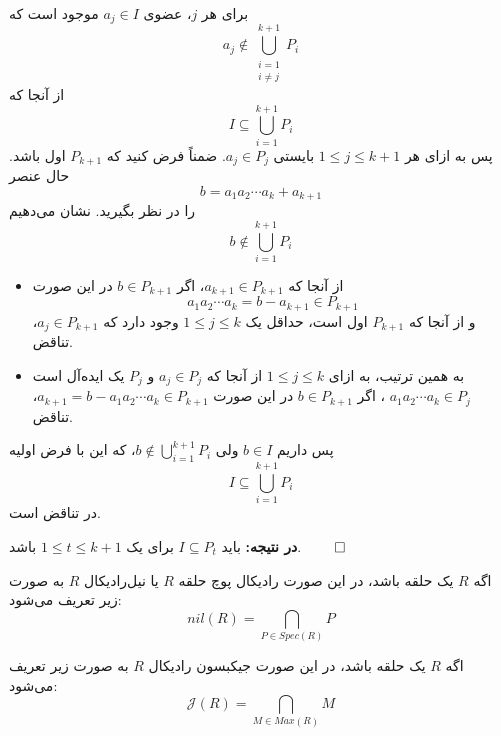 \begin{frame}
    برای هر $j$، عضوی $a_j \in I$ موجود است که $$a_j \notin \bigcup_{\substack{i=1\\i \ne j}}^{k+1} P_i$$
    از آنجا که
    $$I \subseteq \bigcup_{i=1}^{k+1} P_i$$
    پس
    به ازای هر
    \(1 \le j \le k+1\)
    بایستی
    \(a_j \in P_j\). ضمناً فرض کنید که
    \(P_{k+1}\)
    اول باشد.
    حال عنصر
    \[
        b = a_1 a_2 \cdots a_k + a_{k+1}
    \]
    را در نظر بگیرید.
    نشان می‌دهیم
    $$b \notin \bigcup_{i=1}^{k+1} P_i$$

\end{frame}
\begin{frame}

    \begin{itemize}
        \item
              از آنجا که
              \(a_{k+1} \in P_{k+1}\)، اگر
              \(b\in P_{k+1}\)
              در این صورت
              \[a_1a_2\cdots a_k = b - a_{k+1} \in P_{k+1}\]
              و از آنجا که
              \(P_{k+1}\)
              اول است، حداقل یک
              $1 \le j \le k$
              وجود دارد که
              \(a_j \in P_{k+1}\)، تناقض.
        \item به همین ترتیب، به ازای \(1 \le j \le k\) از آنجا که
              \(a_{j} \in P_{j}\)
              و
              \( P_{j}\)
              یک ایده‌آل است
              \(a_1 a_2 \cdots a_k \in P_{j}\)
              ، اگر
              \(b\in P_{k+1}\)
              در این صورت
              \(a_{k+1}  = b - a_1a_2\cdots a_k  \in P_{k+1}\)، تناقض.
    \end{itemize}

    پس داریم $b \in I$ ولی $b \notin \bigcup_{i=1}^{k+1} P_i$، که این با فرض اولیه $$I \subseteq \bigcup_{i=1}^{k+1} P_i$$ در تناقض است.

    \bigskip
    \textbf{در نتیجه:} باید $I \subseteq P_t$ برای یک $1 \le t \le k+1$ باشد.
    \hfill
    \(\qed\)
\end{frame}
\begin{frame}
    \begin{definition}
        اگه $R$
        یک حلقه باشد، در این صورت
        رادیکال‌ پوچ
        حلقه
        $R$
        یا
        نیل‌رادیکال $R$
        به صورت زیر تعریف می‌شود:
        $$nil(R) = \bigcap_{P \in Spec(R)} P$$

    \end{definition}

    \begin{definition}
        اگه $R$
        یک حلقه باشد، در این صورت
        جیکبسون رادیکال $R$
        به صورت زیر تعریف می‌شود:
        $$\mathcal{J}(R) = \bigcap_{M \in Max(R)} M$$

    \end{definition}

\end{frame}


